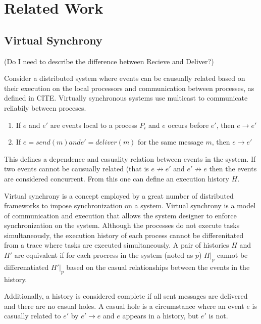 \chapter{Related Work}

\section{Virtual Synchrony}

(Do I need to describe the difference between Recieve and Deliver?)

Consider a distributed system where events can be causually related based
on their execution on the local processors and communication between
processes, as defined in CITE. Virtually synchronous systems use multicast
to communicate reliabily between proceses.

\begin{enumerate}
    \item If $e$ and $e'$ are events local to a process $P_{i}$ and $e$ occurs before $e'$, then $e \rightarrow e'$
    \item If $e = send(m) and e'=deliver(m)$ for the same message $m$, then $e \rightarrow e'$
\end{enumerate}

This defines a dependence and casuality relation between events in the system.
If two events cannot be causually related (that is $e \not\rightarrow e'$ and
$e' \not\rightarrow e$ then the events are considered concurrent. From this
one can define an execution history $H$.

Virtual synchrony is a concept employed by a great number of distributed
frameworks to impose synchronization on a system. Virtual synchrony is a
model of communication and execution that allows the system designer to
enforce synchronization on the system. Although the processes do not
execute tasks simultaneously, the execution history of each process cannot
be differenitated from a trace where tasks are executed simultaneously. A
pair of histories $H$ and $H'$ are equivalent if for each procress in the
system (noted as $p$) $H|_{p}$ cannot be differenatiated $H'|_{p}$ based
on the casual relationships between the events in the history.

Additionally, a history is considered complete if all sent messages are
delivered and there are no casual holes. A casual hole is a circumstance
where an event $e$ is casually related to $e'$ by $e' \rightarrow e$ and
$e$ appears in a history, but $e'$ is not. 

